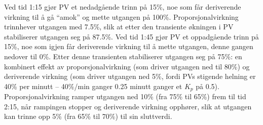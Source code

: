 Ved tid 1:15 gjør PV et nedadgående trinn på 15\%, noe som får deriverende virkning til å gå ``amok'' og mette utgangen på 100\%. Proporsjonalvirkning trinnhever utgangen med 7.5\%, slik at etter den transiente økningen i PV stabiliserer utgangen seg på 87.5\%. Ved tid 1:45 gjør PV et oppadgående trinn på 15\%, noe som igjen får deriverende virkning til å mette utgangen, denne gangen nedover til 0\%. Etter denne transienten stabiliserer utgangen seg på 75\%: en kombinert effekt av proporsjonalvirkning (som driver utgangen ned til 80\%) og deriverende virkning (som driver utgangen ned 5\%, fordi PVs stigende helning er 40\% per minutt -- 40\%/min ganger 0.25 minutt ganger et $K_p$ på 0.5). Proporsjonalvirkning ramper utgangen ned 10\% (fra 75\% til 65\%) frem til tid 2:15, når rampingen stopper og deriverende virkning opphører, slik at utgangen kan trinne opp 5\% (fra 65\% til 70\%) til sin sluttverdi.










